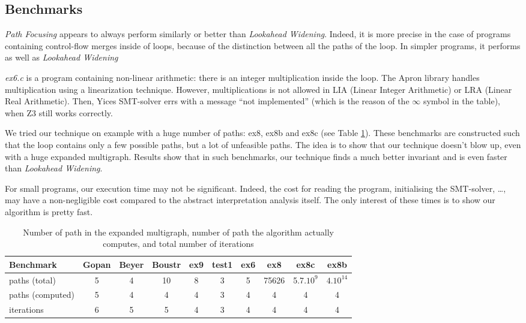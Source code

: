 \documentclass[a4paper,english,titlepage,11pt]{report}
\begin{document}
	\subsection{Benchmarks}

\emph{Path Focusing} appears to always perform similarly or better than 
\emph{Lookahead Widening}. Indeed, it is more precise in the case of programs
containing control-flow merges inside of loops, because of the distinction
between all the paths of the loop. In simpler programs, it performs as well as
\emph{Lookahead Widening}

\emph{ex6.c} is a program containing non-linear arithmetic: there is an integer
multiplication inside the loop. The Apron library handles multiplication using
a linearization technique. However, multiplications is not allowed in LIA
(Linear Integer Arithmetic) or LRA (Linear Real Arithmetic). Then, Yices
SMT-solver errs with a message ``not implemented'' (which is the reason of the
$\infty$ symbol in the table), when Z3 still works correctly.

We tried our technique on example with a huge number of paths: ex8, ex8b and
ex8c (see Table \ref{npaths}). These benchmarks are constructed such that the
loop contains only a few
possible paths, but a lot of unfeasible paths. The idea is to show that our
technique doesn't blow up, even with a huge expanded multigraph. Results show
that in such benchmarks, our technique finds a much better invariant and is even
faster than \emph{Lookahead Widening}.

For small programs, our execution time may not be significant. Indeed, the cost
for reading the program, initialising the SMT-solver, \dots, may have a
	non-negligible cost compared to the abstract interpretation analysis itself.
	The only interest of these times is to show our algorithm is pretty fast.

\begin{table}[!h]
\begin{tabular}{|l||c|c|c|c|c|c|c|c|c|} \hline
Benchmark  & Gopan & Beyer & Boustr & ex9 & test1 & ex6 & ex8 &
ex8c & ex8b\\ \hline \hline
paths (total) & 5 & 4 & 10 & 8 & 3 & 5 & 75626 & 5.7$.10^9$ & $4.10^{14}$\\
\hline
paths (computed) & 5 & 4 & 4 & 4 & 3 & 4 & 4 & 4 & 4\\ \hline
iterations  & 6 & 5 & 5 & 4 & 3 & 4 & 4 & 4 & 4\\ \hline
\end{tabular}
\caption{Number of path in the expanded multigraph, number of path the
algorithm actually computes, and total number of iterations}
\label{npaths}
\end{table}
\end{document}
